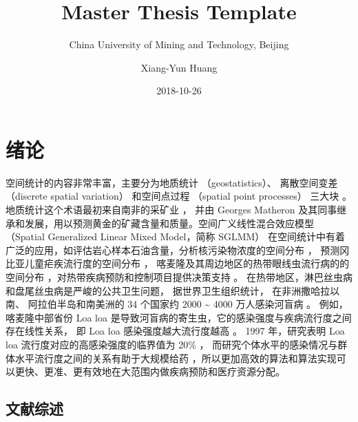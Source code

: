 \documentclass[12pt,a4paper,UTF8,twoside]{book}
\title{Master Thesis Template}
\subtitle{China University of Mining and Technology, Beijing}
\author{Xiang-Yun Huang}
\date{2018-10-26}
\theoremstyle{definition}
\theoremstyle{definition}
\theoremstyle{definition}
\theoremstyle{remark}
\begin{document}





{
\setcounter{tocdepth}{2}
\tableofcontents
}

\mainmatter

\hypertarget{intro}{%
\chapter{绪论}\label{intro}}

空间统计的内容非常丰富，主要分为地质统计 （geostatistics）、
离散空间变差 （discrete spatial variation） 和空间点过程 （spatial point
processes） 三大块 \citep{Cressie1993}。
地质统计这个术语最初来自南非的采矿业 \citep{Krige1951}， 并由 Georges
Matheron
及其同事继承和发展，用以预测黄金的矿藏含量和质量。空间广义线性混合效应模型
（Spatial Generalized Linear Mixed Model，简称 SGLMM）
在空间统计中有着广泛的应用，如评估岩心样本石油含量，分析核污染物浓度的空间分布
\citep{Diggle1998}， 预测冈比亚儿童疟疾流行度的空间分布
\citep{Diggle2002Childhood}，
喀麦隆及其周边地区的热带眼线虫流行病的的空间分布
\citep{Diggle2007ATMP}，对热带疾病预防和控制项目提供决策支持
\citep{Schl2016Using}。
在热带地区，淋巴丝虫病和盘尾丝虫病是严峻的公共卫生问题，
据世界卫生组织统计， 在非洲撒哈拉以南、 阿拉伯半岛和南美洲的 34 个国家约
2000 \textasciitilde{} 4000 万人感染河盲病 \citep{Takougang2002Rapid}。
例如， 喀麦隆中部省份 Loa loa
是导致河盲病的寄生虫，它的感染强度与疾病流行度之间存在线性关系， 即 Loa
loa 感染强度越大流行度越高 \citep{Boussinesq2001}。 1997 年，研究表明
Loa loa 流行度对应的高感染强度的临界值为 20\%
\citep{Gardon1997Serious}，
而研究个体水平的感染情况与群体水平流行度之间的关系有助于大规模给药
\citep{Schl2016Using}，所以更加高效的算法和算法实现可以更快、更准、更有效地在大范围内做疾病预防和医疗资源分配。

\hypertarget{reviews}{%
\section{文献综述}\label{reviews}}
\end{document}
